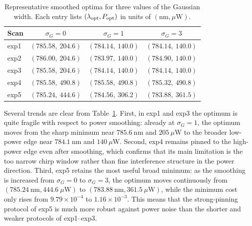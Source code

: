 \documentclass[aps,%
onecolumn,%
floatfix,%
pra,%
amsfonts,%
longbibliography,%
groupedaddress,%
superscriptaddress]{revtex4-2}%
\newcommand{\1}{\mathbbm{1}}
\begin{document}
\begin{table}[h]
    \centering
    \caption{Representative smoothed optima for three values of the Gaussian
    width. Each entry lists $(\lambda_{\rm opt},P_{\rm opt})$ in units of
    $(\mathrm{nm},\mu\mathrm{W})$.}
    \label{tab:smoothing_summary}
    \begin{tabular}{lccc}
        \toprule
        Scan & $\sigma_G=0$ & $\sigma_G=1$ & $\sigma_G=3$ \\
        \midrule
        exp1 & $(785.58,\ 204.6)$ & $(784.14,\ 140.0)$ & $(784.14,\ 140.0)$ \\
        exp2 & $(786.00,\ 204.6)$ & $(783.97,\ 140.0)$ & $(784.90,\ 140.0)$ \\
        exp3 & $(785.58,\ 204.6)$ & $(784.14,\ 140.0)$ & $(784.14,\ 140.0)$ \\
        exp4 & $(785.58,\ 490.8)$ & $(785.58,\ 490.8)$ & $(785.32,\ 490.8)$ \\
        exp5 & $(785.24,\ 444.6)$ & $(784.56,\ 306.2)$ & $(783.88,\ 361.5)$ \\
        \bottomrule
    \end{tabular}
\end{table}

Several trends are clear from Table~\ref{tab:smoothing_summary}. First, in
exp1 and exp3 the optimum is quite fragile with respect to power smoothing:
already at $\sigma_G=1$, the optimum moves from the sharp minimum near
$785.6~\mathrm{nm}$ and $205~\mu\mathrm{W}$ to the broader low-power edge near
$784.1~\mathrm{nm}$ and $140~\mu\mathrm{W}$. Second, exp4 remains pinned to the
high-power edge even after smoothing, which confirms that its main limitation
is the too narrow chirp window rather than fine interference structure in the
power direction. Third, exp5 retains the most useful broad minimum: as the
smoothing is increased from $\sigma_G=0$ to $\sigma_G=3$, the optimum moves
continuously from $(785.24~\mathrm{nm},444.6~\mu\mathrm{W})$ to
$(783.88~\mathrm{nm},361.5~\mu\mathrm{W})$, while the minimum cost only rises
from $9.79\times 10^{-4}$ to $1.16\times 10^{-3}$. This means that the
strong-pinning protocol of exp5 is much more robust against power noise than
the shorter and weaker protocols of exp1--exp3.
\end{document}
